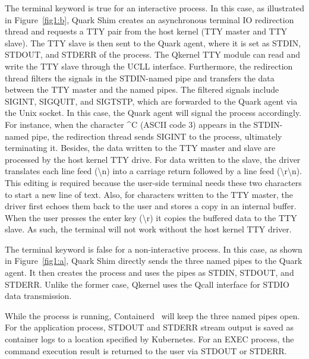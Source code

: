 The terminal keyword is true for an interactive process. In this case, as illustrated in Figure~\ref{fig1:b}, Quark Shim creates an asynchronous terminal IO redirection thread and requests a TTY pair from the host kernel (TTY master and TTY slave). The TTY 
slave is then sent to the Quark agent, where it is set as STDIN, STDOUT, and STDERR of the process. The Qkernel TTY module can read and write the TTY slave through the UCLL interface. Furthermore, the redirection thread filters the signals in the STDIN-named pipe and 
transfers the data between the TTY master and the named pipes. The filtered signals include SIGINT, SIGQUIT, and SIGTSTP, which are forwarded to the Quark agent via the Unix socket. In this case, the Quark agent will signal the process accordingly. For instance, when the character \textasciicircum C (ASCII code 3) appears in 
the STDIN-named pipe, the redirection thread sends SIGINT to the process, ultimately terminating it. Besides, the data written to the TTY master and slave are processed by the host kernel TTY drive. For data written to the slave, the driver translates each line feed (\textbackslash n) into a carriage return
followed by a line feed (\textbackslash r\textbackslash n). This editing is required because the user-side terminal needs these two characters to start a new line of text. Also, for characters written to the TTY master, the driver first echoes them back to the user and stores a copy in an internal buffer. When the user presses the enter key (\textbackslash r) 
it copies the buffered data to the TTY slave. As such, the terminal will not work without the host kernel TTY driver.

The terminal keyword is false for a non-interactive process. In this case, as shown in Figure~\ref{fig1:a}, Quark Shim directly sends the three named pipes to the Quark agent. It then creates the process and uses the pipes as STDIN, STDOUT, and STDERR. 
Unlike the former case, Qkernel uses the Qcall interface for STDIO data transmission.

While the process is running, Containerd~\cite*{containerd} will keep the three named pipes open. For the application process, STDOUT and STDERR stream output is saved as container logs to a location specified by Kubernetes\cite*{k8s}. For an EXEC process, the command execution result is returned to the user via 
STDOUT or STDERR.


